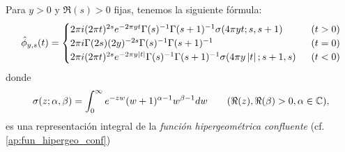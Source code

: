 \begin{lema}%
  Para $y>0$ y $\Re(s)>0$ fijas, tenemos la siguiente f\'ormula:
  \begin{equation}\label{eq:trans_de_phi}
  \hat{\phi}_{y,s}(t)=
  \begin{cases}
    2\pi i(2\pi t)^{2s}e^{-2\pi yt}\Gamma(s)^{-1}\Gamma(s+1)^{-1}\sigma(4\pi yt;s,s+1) &\;\;(t>0)\\
    2\pi i\Gamma(2s)(2y)^{-2s}\Gamma(s)^{-1}\Gamma(s+1)^{-1} &\;\; (t=0)\\
    2\pi i(2\pi t)^{2s}e^{-2\pi y\abs{t}}\Gamma(s)^{-1}\Gamma(s+1)^{-1}\sigma(4\pi y\abs{t};s+1,s)%
    &\;\;(t<0)
  \end{cases} 
\end{equation}
donde
\[
  \sigma(z;\alpha,\beta)=\int_0^{\infty}e^{-zw}(w+1)^{\alpha-1}w^{\beta-1}dw
  \qquad(\Re(z),\Re(\beta)>0,\alpha\in\mathbb{C}),
\]
es una representaci\'on integral de la \emph{funci\'on hipergeom\'etrica confluente}
(cf. \ref{ap:fun_hipergeo_conf})
\end{lema}%

